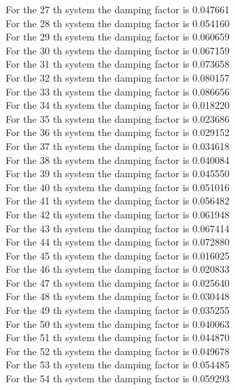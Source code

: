 \documentclass[11pt]{article}
\begin{document}
For the 27 th system the damping factor is 0.047661 \\
For the 28 th system the damping factor is 0.054160 \\
For the 29 th system the damping factor is 0.060659 \\
For the 30 th system the damping factor is 0.067159 \\
For the 31 th system the damping factor is 0.073658 \\
For the 32 th system the damping factor is 0.080157 \\
For the 33 th system the damping factor is 0.086656 \\
For the 34 th system the damping factor is 0.018220 \\
For the 35 th system the damping factor is 0.023686 \\
For the 36 th system the damping factor is 0.029152 \\
For the 37 th system the damping factor is 0.034618 \\
For the 38 th system the damping factor is 0.040084 \\
For the 39 th system the damping factor is 0.045550 \\
For the 40 th system the damping factor is 0.051016 \\
For the 41 th system the damping factor is 0.056482 \\
For the 42 th system the damping factor is 0.061948 \\
For the 43 th system the damping factor is 0.067414 \\
For the 44 th system the damping factor is 0.072880 \\
For the 45 th system the damping factor is 0.016025 \\
For the 46 th system the damping factor is 0.020833 \\
For the 47 th system the damping factor is 0.025640 \\
For the 48 th system the damping factor is 0.030448 \\
For the 49 th system the damping factor is 0.035255 \\
For the 50 th system the damping factor is 0.040063 \\
For the 51 th system the damping factor is 0.044870 \\
For the 52 th system the damping factor is 0.049678 \\
For the 53 th system the damping factor is 0.054485 \\
For the 54 th system the damping factor is 0.059293 \\
\end{document}

